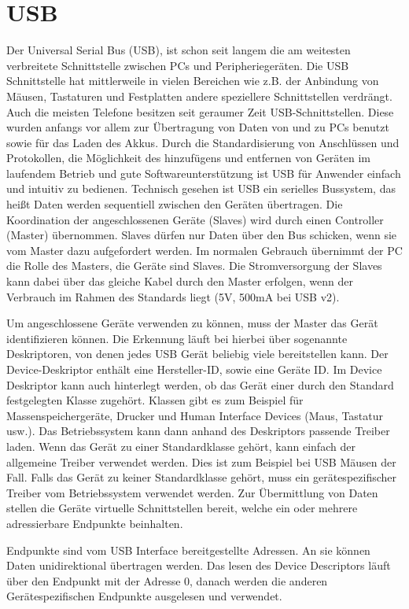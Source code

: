 \documentclass[12pt,journal,compsoc]{IEEEtran}
\begin{document}
\section{USB}
Der Universal Serial Bus (USB), ist schon seit langem die am weitesten verbreitete Schnittstelle zwischen PCs und Peripheriegeräten.
Die USB Schnittstelle hat mittlerweile in vielen Bereichen wie z.B. der Anbindung von Mäusen, Tastaturen und Festplatten andere speziellere Schnittstellen verdrängt.
Auch die meisten Telefone besitzen seit geraumer Zeit USB-Schnittstellen. Diese wurden anfangs vor allem zur Übertragung von Daten von und zu PCs benutzt sowie für das Laden des Akkus.
Durch die Standardisierung von Anschlüssen und Protokollen, die Möglichkeit des hinzufügens und entfernen von Geräten im laufendem Betrieb und gute Softwareunterstützung ist USB für Anwender einfach und intuitiv zu bedienen.
Technisch gesehen ist USB ein serielles Bussystem, das heißt Daten werden sequentiell zwischen den Geräten übertragen. 
Die Koordination der angeschlossenen Geräte (Slaves) wird durch einen Controller (Master) übernommen.
Slaves dürfen nur Daten über den Bus schicken, wenn sie vom Master dazu aufgefordert werden.
Im normalen Gebrauch übernimmt der PC die Rolle des Masters, die Geräte sind Slaves. Die Stromversorgung der Slaves kann dabei über das gleiche Kabel durch den Master erfolgen, wenn der Verbrauch im Rahmen des Standards liegt (5V, 500mA bei USB v2).

Um angeschlossene Geräte verwenden zu können, muss der Master das Gerät identifizieren können. 
Die Erkennung läuft bei hierbei über sogenannte Deskriptoren, von denen jedes USB Gerät beliebig viele bereitstellen kann. 
Der Device-Deskriptor enthält eine Hersteller-ID, sowie eine Geräte ID.
Im Device Deskriptor kann auch hinterlegt werden, ob das Gerät einer durch den Standard festgelegten Klasse zugehört. 
Klassen gibt es zum Beispiel für Massenspeichergeräte, Drucker und Human Interface Devices (Maus, Tastatur usw.).
Das Betriebssystem kann dann anhand des Deskriptors passende Treiber laden. Wenn das Gerät zu einer Standardklasse gehört, kann einfach der allgemeine Treiber verwendet werden. Dies ist zum Beispiel bei USB Mäusen der Fall.
Falls das Gerät zu keiner Standardklasse gehört, muss ein gerätespezifischer Treiber vom Betriebssystem verwendet werden.
Zur Übermittlung von Daten stellen die Geräte virtuelle Schnittstellen bereit, welche ein oder mehrere adressierbare Endpunkte beinhalten. 

Endpunkte sind vom USB Interface bereitgestellte Adressen. An sie können Daten unidirektional übertragen werden.
Das lesen des Device Descriptors läuft über den Endpunkt mit der Adresse 0, danach werden die anderen Gerätespezifischen Endpunkte ausgelesen und verwendet.
\end{document}
